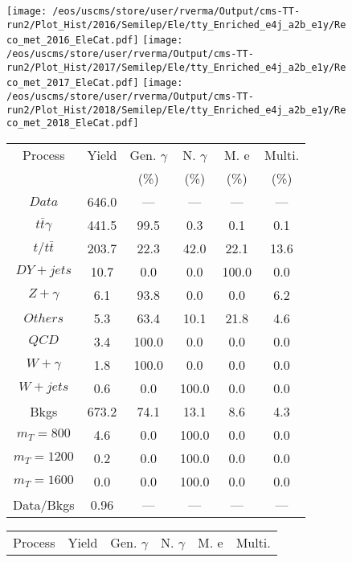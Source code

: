 \begin{figure}
\centering
\texttt{[image: /eos/uscms/store/user/rverma/Output/cms-TT-run2/Plot\_Hist/2016/Semilep/Ele/tty\_Enriched\_e4j\_a2b\_e1y/Reco\_met\_2016\_EleCat.pdf]}
\texttt{[image: /eos/uscms/store/user/rverma/Output/cms-TT-run2/Plot\_Hist/2017/Semilep/Ele/tty\_Enriched\_e4j\_a2b\_e1y/Reco\_met\_2017\_EleCat.pdf]}
\texttt{[image: /eos/uscms/store/user/rverma/Output/cms-TT-run2/Plot\_Hist/2018/Semilep/Ele/tty\_Enriched\_e4j\_a2b\_e1y/Reco\_met\_2018\_EleCat.pdf]}
\begin{minipage}[c]{0.32\textwidth}
\centering
\tiny{
\begin{tabular}{cccccc}
\hline
Process & Yield & Gen. $\gamma$ & N. $\gamma$ & M. e & Multi. \\
 &  & (\%) & (\%) & (\%) & (\%)  \\
\hline
                                                                      $ Data $ &  646.0 &  --- &  --- &  --- &  ---\\
$ t\bar{t}\gamma $ &  441.5 &  99.5 &  0.3 &  0.1 &  0.1\\
$ t/t\bar{t} $ &  203.7 &  22.3 &  42.0 &  22.1 &  13.6\\
$ DY+jets $ &  10.7 &  0.0 &  0.0 &  100.0 &  0.0\\
$ Z+\gamma $ &  6.1 &  93.8 &  0.0 &  0.0 &  6.2\\
$ Others $ &  5.3 &  63.4 &  10.1 &  21.8 &  4.6\\
$ QCD $ &  3.4 &  100.0 &  0.0 &  0.0 &  0.0\\
$ W+\gamma $ &  1.8 &  100.0 &  0.0 &  0.0 &  0.0\\
$ W+jets $ &  0.6 &  0.0 &  100.0 &  0.0 &  0.0\\
Bkgs &  673.2 &  74.1 &  13.1 &  8.6 &  4.3\\
$ m_{T} = 800 $ &  4.6 &  0.0 &  100.0 &  0.0 &  0.0\\
$ m_{T} = 1200 $ &  0.2 &  0.0 &  100.0 &  0.0 &  0.0\\
$ m_{T} = 1600 $ &  0.0 &  0.0 &  100.0 &  0.0 &  0.0\\
Data/Bkgs &  0.96 &  --- &  --- &  --- &  ---\\
\hline
\end{tabular}
}
\end{minipage}
\begin{minipage}[c]{0.32\textwidth}
\centering
\tiny{
\begin{tabular}{cccccc}
\hline
Process & Yield & Gen. $\gamma$ & N. $\gamma$ & M. e & Multi. \\

\end{tabular}}
\end{minipage}
\end{figure}
